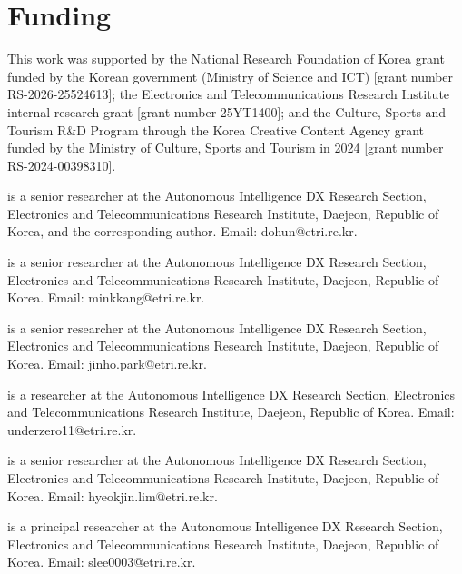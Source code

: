 \documentclass[unnumsec,webpdf,contemporary,large,numbered]{oup-authoring-template}
\begin{document}
\section{Funding}

This work was supported by the National Research Foundation of Korea grant funded by the Korean
government (Ministry of Science and ICT) [grant number RS-2026-25524613]; the Electronics and
Telecommunications Research Institute internal research grant [grant number 25YT1400]; and the
Culture, Sports and Tourism R\&D Program through the Korea Creative Content Agency grant funded
by the Ministry of Culture, Sports and Tourism in 2024 [grant number RS-2024-00398310].




\begin{biography}{}{\author{Dohun Kim} is a senior researcher at the Autonomous Intelligence DX Research Section, Electronics and Telecommunications Research Institute, Daejeon, Republic of Korea, and the corresponding author. Email: dohun@etri.re.kr.}
\end{biography}
\begin{biography}{}{\author{Minho Bae} is a senior researcher at the Autonomous Intelligence DX Research Section, Electronics and Telecommunications Research Institute, Daejeon, Republic of Korea. Email: minkkang@etri.re.kr.}
\end{biography}
\begin{biography}{}{\author{Jinho Park} is a senior researcher at the Autonomous Intelligence DX Research Section, Electronics and Telecommunications Research Institute, Daejeon, Republic of Korea. Email: jinho.park@etri.re.kr.}
\end{biography}
\begin{biography}{}{\author{Hayoung Lee} is a researcher at the Autonomous Intelligence DX Research Section, Electronics and Telecommunications Research Institute, Daejeon, Republic of Korea. Email: underzero11@etri.re.kr.}
\end{biography}
\begin{biography}{}{\author{Hyeokjin Lim} is a senior researcher at the Autonomous Intelligence DX Research Section, Electronics and Telecommunications Research Institute, Daejeon, Republic of Korea. Email: hyeokjin.lim@etri.re.kr.}
\end{biography}
\begin{biography}{}{\author{Seonghee Lee} is a principal researcher at the Autonomous Intelligence DX Research Section, Electronics and Telecommunications Research Institute, Daejeon, Republic of Korea. Email: slee0003@etri.re.kr.}
\end{biography}
\end{document}
